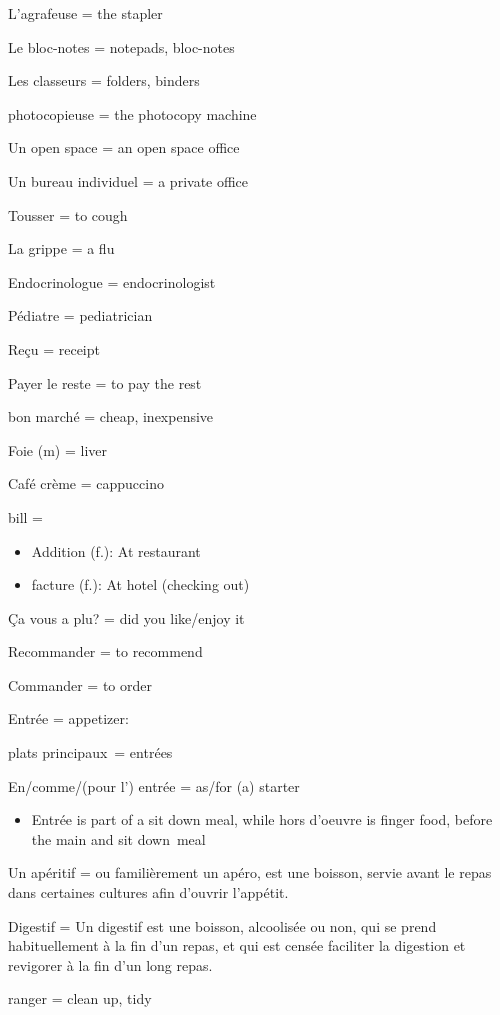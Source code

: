 L'agrafeuse = the stapler~

Le bloc-notes = notepads, bloc-notes

Les classeurs = folders, binders

photocopieuse = the photocopy machine~

Un open space = an open space office~

Un bureau individuel = a private office~

Tousser = to cough

La grippe = a flu

Endocrinologue = endocrinologist

Pédiatre = pediatrician

Reçu = receipt~

Payer le reste = to pay the rest

bon marché = cheap, inexpensive

Foie (m) = liver

Café crème = cappuccino~

bill =~

\begin{itemize}
\item
  Addition (f.): At restaurant
\item
  facture (f.): At hotel (checking out)
\end{itemize}

Ça vous a plu? = did you like/enjoy it

Recommander = to recommend~

Commander = to order

Entrée = appetizer:

plats principaux~= entrées

En/comme/(pour l') entrée = as/for (a) starter

\begin{itemize}
\item
  Entrée is part of a sit down meal, while hors d'oeuvre is finger food,
  before the main and sit down~meal~
\end{itemize}

Un apéritif = ou familièrement un apéro, est une boisson, servie avant
le repas dans certaines cultures afin d'ouvrir l'appétit.

Digestif = Un digestif est une boisson, alcoolisée ou non, qui se prend
habituellement à la fin d'un repas, et qui est censée faciliter la
digestion et revigorer à la fin d'un long repas.

ranger = clean up, tidy

